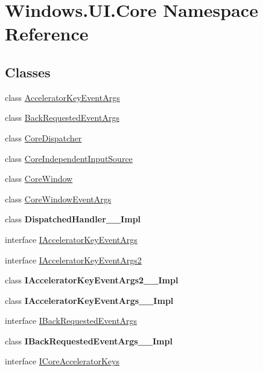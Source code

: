 \hypertarget{namespace_windows_1_1_u_i_1_1_core}{}\section{Windows.\+U\+I.\+Core Namespace Reference}
\label{namespace_windows_1_1_u_i_1_1_core}
\subsection*{Classes}
\begin{DoxyCompactItemize}
\item 
class \hyperlink{class_windows_1_1_u_i_1_1_core_1_1_accelerator_key_event_args}{Accelerator\+Key\+Event\+Args}
\item 
class \hyperlink{class_windows_1_1_u_i_1_1_core_1_1_back_requested_event_args}{Back\+Requested\+Event\+Args}
\item 
class \hyperlink{class_windows_1_1_u_i_1_1_core_1_1_core_dispatcher}{Core\+Dispatcher}
\item 
class \hyperlink{class_windows_1_1_u_i_1_1_core_1_1_core_independent_input_source}{Core\+Independent\+Input\+Source}
\item 
class \hyperlink{class_windows_1_1_u_i_1_1_core_1_1_core_window}{Core\+Window}
\item 
class \hyperlink{class_windows_1_1_u_i_1_1_core_1_1_core_window_event_args}{Core\+Window\+Event\+Args}
\item 
class {\bfseries Dispatched\+Handler\+\_\+\+\_\+\+Impl}
\item 
interface \hyperlink{interface_windows_1_1_u_i_1_1_core_1_1_i_accelerator_key_event_args}{I\+Accelerator\+Key\+Event\+Args}
\item 
interface \hyperlink{interface_windows_1_1_u_i_1_1_core_1_1_i_accelerator_key_event_args2}{I\+Accelerator\+Key\+Event\+Args2}
\item 
class {\bfseries I\+Accelerator\+Key\+Event\+Args2\+\_\+\+\_\+\+Impl}
\item 
class {\bfseries I\+Accelerator\+Key\+Event\+Args\+\_\+\+\_\+\+Impl}
\item 
interface \hyperlink{interface_windows_1_1_u_i_1_1_core_1_1_i_back_requested_event_args}{I\+Back\+Requested\+Event\+Args}
\item 
class {\bfseries I\+Back\+Requested\+Event\+Args\+\_\+\+\_\+\+Impl}
\item 
interface \hyperlink{interface_windows_1_1_u_i_1_1_core_1_1_i_core_accelerator_keys}{I\+Core\+Accelerator\+Keys}

\end{DoxyCompactItemize}
